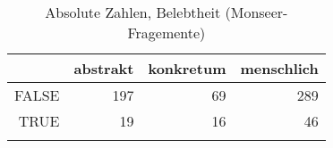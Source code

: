 \begin{table}[ht]
\centering
\begin{tabular}{rrrr}
  \lsptoprule
 & abstrakt & konkretum & menschlich \\ 
  \midrule
FALSE & 197 &  69 & 289 \\ 
  TRUE &  19 &  16 &  46 \\ 
   \lspbottomrule
\end{tabular}
\caption{Absolute Zahlen, Belebtheit  (Monseer-Fragemente)} 
\end{table}
